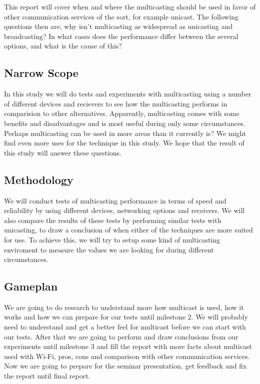 \documentclass[9pt,a4paper]{acmproc}
\begin{document}
This report will cover when and where the multicasting should be used in favor of other communication services of the sort, for example unicast. The following questions then are, why isn't multicasting as widespread as unicasting and broadcasting? In what cases does the performance differ between the several options, and what is the cause of this?

\subsection{Narrow Scope}

In this study we will do tests and experiments with multicasting using a number of different devices and recievers to see how the multicasting performs in comparision to other alternatives. Apparently, multicasting comes with some benefits and disadvantages and is most useful during only some circumstances. Perhaps multicasting can be used in more areas than it currently is? We might find even more uses for the technique in this study. We hope that the result of this study will answer these questions.

\subsection{Methodology}

We will conduct tests of multicasting performance in terms of speed and reliability by using different devices, networking options and receivers. We will also compare the results of these tests by performing similar tests with unicasting, to draw a conclusion of when either of the techniques are more suited for use. To achieve this, we will try to setup some kind of multicasting enviroment to measure the values we are looking for during different circumstances.

\subsection{Gameplan}

We are going to do research to understand more how multicast is used, how it works and how we can prepare for our tests until milestone 2. We will probably need to understand and get a better feel for multicast before we can start with our tests. After that we are going to perform and draw conclusions from our experiments until milestone 3 and fill the report with more facts about multicast used with Wi-Fi, pros, cons and comparison with other communication services. Now we are going to prepare for the seminar presentation, get feedback and fix the report until final report.
\end{document}
